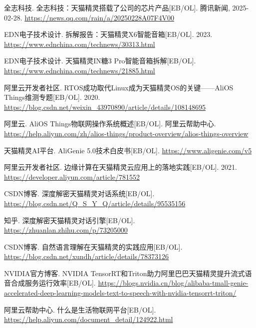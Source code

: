 \documentclass[12pt, a4paper, twoside, openright]{book}
\begin{document}
\begin{enumerate}[label={[\arabic*]}, leftmargin=3em]

\item 全志科技. 全志科技：天猫精灵搭载了公司的芯片产品[EB/OL]. 腾讯新闻, 2025-02-28. \url{https://news.qq.com/rain/a/20250228A07F4V00}

\item EDN电子技术设计. 拆解报告：天猫精灵X6智能音箱[EB/OL]. 2023. \url{https://www.ednchina.com/technews/30313.html}

\item EDN电子技术设计. 天猫精灵IN糖3 Pro智能音箱拆解[EB/OL]. \url{https://www.ednchina.com/technews/21885.html}

\item 阿里云开发者社区. RTOS成功取代Linux成为天猫精灵OS的关键——AliOS Things维测专题[EB/OL]. 2020. \url{https://blog.csdn.net/weixin_43970890/article/details/108148695}

\item 阿里云. AliOS Things物联网操作系统概述[EB/OL]. 阿里云帮助中心. \url{https://help.aliyun.com/zh/alios-things/product-overview/alios-things-overview}

\item 天猫精灵AI平台. AliGenie 5.0技术白皮书[EB/OL]. \url{https://www.aligenie.com/v5}

\item 阿里云开发者社区. 边缘计算在天猫精灵云应用上的落地实践[EB/OL]. 2021. \url{https://developer.aliyun.com/article/781552}

\item CSDN博客. 深度解密天猫精灵对话系统[EB/OL]. \url{https://blog.csdn.net/Q_S_Y_Q/article/details/95535156}

\item 知乎. 深度解密天猫精灵对话引擎[EB/OL]. \url{https://zhuanlan.zhihu.com/p/73205000}

\item CSDN博客. 自然语言理解在天猫精灵的实践应用[EB/OL]. \url{https://blog.csdn.net/xundh/article/details/78373126}

\item NVIDIA官方博客. NVIDIA TensorRT和Triton助力阿里巴巴天猫精灵提升流式语音合成服务运行效率[EB/OL]. \url{https://blogs.nvidia.cn/blog/alibaba-tmall-genie-accelerated-deep-learning-models-text-to-speech-with-nvidia-tensorrt-triton/}

\item 阿里云帮助中心. 什么是生活物联网平台[EB/OL]. \url{https://help.aliyun.com/document_detail/124922.html}


\end{enumerate}
\end{document}
